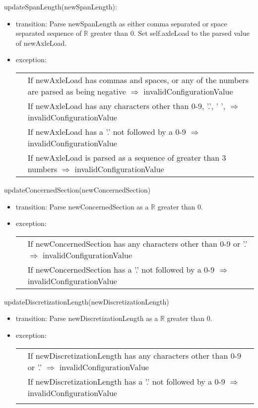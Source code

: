 \documentclass[12pt, titlepage]{article}
\begin{document}
\noindent updateSpanLength(newSpanLength):
\begin{itemize}
\item transition: Parse newSpanLength as either comma separated or space separated sequence of $\mathbb{R}$ greater than 0. Set self.axleLoad to the parsed value of newAxleLoad.
\item exception:\\
    \begin{tabular}{p{1cm} p{16cm}}
    & If newAxleLoad has commas and spaces, or any of the numbers are parsed as being negative $\Rightarrow$ invalidConfigurationValue\\
    & If newAxleLoad has any characters other than 0-9, '.', ' ', $\Rightarrow$ invalidConfigurationValue\\
    & If newAxleLoad has a '.' not followed by a 0-9 $\Rightarrow$ invalidConfigurationValue\\
    & If newAxleLoad is parsed as a sequence of greater than 3 numbers $\Rightarrow$ invalidConfigurationValue\\
    \end{tabular}
\end{itemize}

\noindent updateConcernedSection(newConcernedSection)
\begin{itemize}
\item transition: Parse newConcernedSection as a $\mathbb{R}$ greater than 0.
\item exception:\\
    \begin{tabular}{p{1cm} p{12cm}}
    & If newConcernedSection has any characters other than 0-9 or '.'$\Rightarrow$ invalidConfigurationValue \\
    & If newConcernedSection has a '.' not followed by a 0-9 $\Rightarrow$ invalidConfigurationValue \\
    \end{tabular}
\end{itemize}

\noindent updateDiscretizationLength(newDiscretizationLength)
\begin{itemize}
\item transition: Parse newDiscretizationLength as a $\mathbb{R}$ greater than 0.
\item exception:\\
    \begin{tabular}{p{1cm} p{12cm}}
 & If newDiscretizationLength has any characters other than 0-9 or '.' $\Rightarrow$ invalidConfigurationValue\\
& If newDiscretizationLength has a '.' not followed by a 0-9 $\Rightarrow$ invalidConfigurationValue\\
 \\
    \end{tabular}
\end{itemize}
\end{document}
